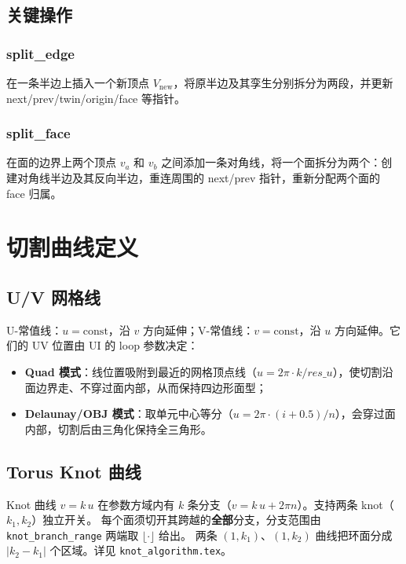 \documentclass[12pt,a4paper]{article}
\begin{document}
\subsection{关键操作}

\subsubsection{split\_edge}

在一条半边上插入一个新顶点 $V_{\text{new}}$，将原半边及其孪生分别拆分为两段，并更新 next/prev/twin/origin/face 等指针。

\subsubsection{split\_face}

在面的边界上两个顶点 $v_a$ 和 $v_b$ 之间添加一条对角线，将一个面拆分为两个：创建对角线半边及其反向半边，重连周围的 next/prev 指针，重新分配两个面的 face 归属。

\section{切割曲线定义}

\subsection{U/V 网格线}

U-常值线：$u = \mathrm{const}$，沿 $v$ 方向延伸；V-常值线：$v = \mathrm{const}$，沿 $u$ 方向延伸。它们的 UV 位置由 UI 的 loop 参数决定：
\begin{itemize}
\item \textbf{Quad 模式}：线位置吸附到最近的网格顶点线（$u = 2\pi\cdot k / res\_u$），使切割沿面边界走、不穿过面内部，从而保持四边形面型；
\item \textbf{Delaunay/OBJ 模式}：取单元中心等分（$u = 2\pi\cdot(i+0.5)/n$），会穿过面内部，切割后由三角化保持全三角形。
\end{itemize}

\subsection{Torus Knot 曲线}

Knot 曲线 $v = k\,u$ 在参数方域内有 $k$ 条分支（$v = k\,u + 2\pi n$）。支持两条 knot（$k_1, k_2$）独立开关。
每个面须切开其跨越的\textbf{全部}分支，分支范围由 \texttt{knot\_branch\_range} 两端取 $\lfloor\cdot\rfloor$ 给出。
两条 $(1,k_1)$、$(1,k_2)$ 曲线把环面分成 $|k_2-k_1|$ 个区域。详见 \texttt{knot\_algorithm.tex}。
\end{document}
